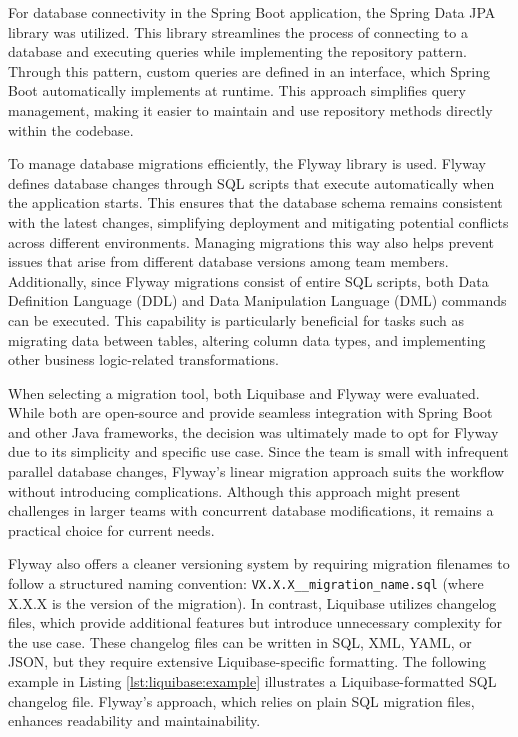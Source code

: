 For database connectivity in the Spring Boot application, the Spring Data JPA library was utilized. This library streamlines the process of connecting to a database and executing queries while implementing the repository pattern. Through this pattern, custom queries are defined in an interface, which Spring Boot automatically implements at runtime. This approach simplifies query management, making it easier to maintain and use repository methods directly within the codebase.

To manage database migrations efficiently, the Flyway \cite{FlywayDocs} library is used. Flyway defines database changes through SQL scripts that execute automatically when the application starts. This ensures that the database schema remains consistent with the latest changes, simplifying deployment and mitigating potential conflicts across different environments. Managing migrations this way also helps prevent issues that arise from different database versions among team members. Additionally, since Flyway migrations consist of entire SQL scripts, both Data Definition Language (DDL) and Data Manipulation Language (DML) commands can be executed. This capability is particularly beneficial for tasks such as migrating data between tables, altering column data types, and implementing other business logic-related transformations.

When selecting a migration tool, both Liquibase \cite{LiquibaseDocs} and Flyway were evaluated. While both are open-source and provide seamless integration with Spring Boot and other Java frameworks, the decision was ultimately made to opt for Flyway due to its simplicity and specific use case. Since the team is small with infrequent parallel database changes, Flyway’s linear migration approach suits the workflow without introducing complications. Although this approach might present challenges in larger teams with concurrent database modifications, it remains a practical choice for current needs.

Flyway also offers a cleaner versioning system by requiring migration filenames to follow a structured naming convention: \texttt{VX.X.X\_\_migration\_name.sql} (where X.X.X is the version of the migration). In contrast, Liquibase utilizes changelog files, which provide additional features but introduce unnecessary complexity for the use case. These changelog files can be written in SQL, XML, YAML, or JSON, but they require extensive Liquibase-specific formatting. The following example in Listing \ref{lst:liquibase:example} illustrates a Liquibase-formatted SQL changelog file. Flyway's approach, which relies on plain SQL migration files, enhances readability and maintainability.

